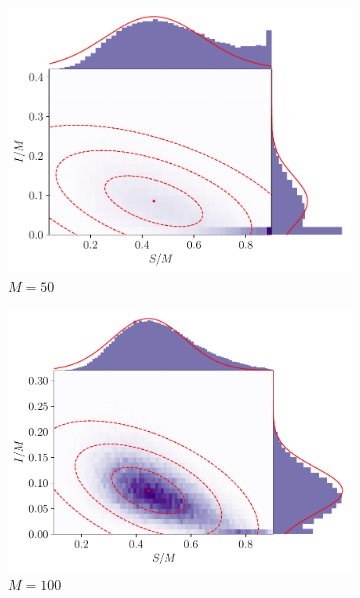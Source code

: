 \begin{figure}
	\begin{center}
		\begin{subfigure}{0.49\textwidth}
			\includegraphics[width=\textwidth]{chp06_applications/figures/sir/sir_pairwise_50}
			\caption{\(M = 50\)}
			\label{fig:sir_gauss_rels_1}
		\end{subfigure}
		\begin{subfigure}{0.49\textwidth}
			\includegraphics[width=\textwidth]{chp06_applications/figures/sir/sir_pairwise_100}
			\caption{\(M = 100\)}
			\label{fig:sir_gauss_rels_2}
		\end{subfigure}
		\begin{subfigure}{0.49\textwidth}

\end{subfigure}
\end{center}
\end{figure}
